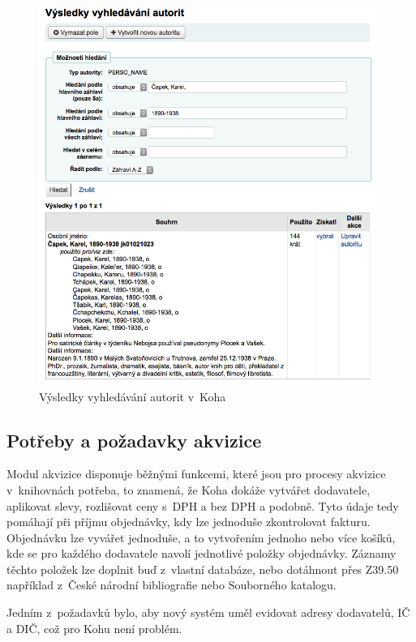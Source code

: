 \documentclass[
	11pt, oneside, printed, final, palatino, monochrome
	microtype,
	table,   %
	lof,     %
	lot     %
]{fithesis3}
\begin{document}
{\begin{figure}
    \centering
    \includegraphics[width=1.0\textwidth]{resources/vysledky_vyhledavani_autorit}
    \caption{Výsledky vyhledávání autorit v~Koha}
    \label{fig:vysledky_vyhledavani_autorit}
\end{figure}

\subsection{Potřeby a požadavky akvizice}
Modul akvizice disponuje běžnými funkcemi, které jsou pro procesy akvizice v~knihovnách potřeba, to znamená, že Koha dokáže vytvářet dodavatele, aplikovat slevy, rozlišovat ceny s~DPH a bez DPH a podobně. Tyto údaje tedy pomáhají při příjmu objednávky, kdy lze jednoduše zkontrolovat fakturu. Objednávku lze vyvářet jednoduše, a to vytvořením jednoho nebo více košíků, kde se pro každého dodavatele navolí jednotlivé položky objednávky. Záznamy těchto položek lze doplnit buď z~vlastní databáze, nebo dotáhnout přes Z39.50 například z~České národní bibliografie nebo Souborného katalogu.

Jedním z~požadavků bylo, aby nový systém uměl evidovat adresy dodavatelů, IČ a DIČ, což pro Kohu není problém.

}
\end{document}
